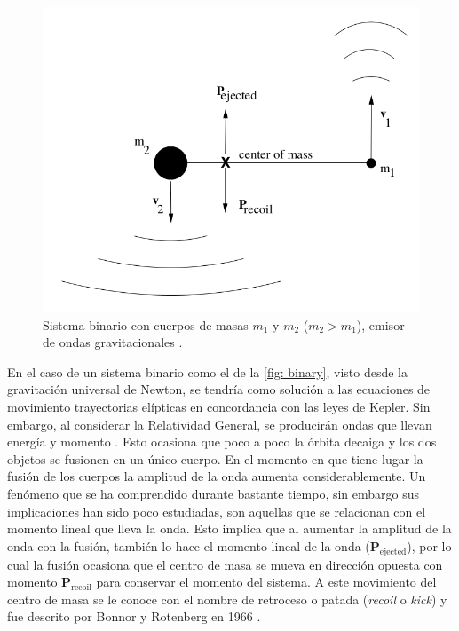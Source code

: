 	\begin{figure}[h]
		\centering
		\includegraphics[width=0.6\linewidth]{Figures/binarySystem}
		\caption{Sistema binario con cuerpos de masas $m_1$ y $m_2$ ($m_2 > m_1$), emisor de ondas gravitacionales \cite{hughes2005black}.}
		\label{fig: binary}
	\end{figure}
	
	En el caso de un sistema binario como el de la \autoref{fig: binary}, visto desde la gravitación universal de Newton, se tendría como solución a las ecuaciones de movimiento trayectorias elípticas en concordancia con las leyes de Kepler. Sin embargo, al considerar la Relatividad General, se producirán ondas que llevan energ\'ia y momento \cite{hughes2005black, hoyng2006gravitational, brugmann2018fundamentals}. Esto ocasiona que poco a poco la \'orbita decaiga y los dos objetos se fusionen en un \'unico cuerpo. En el momento en que tiene lugar la fusi\'on de los cuerpos la amplitud de la onda aumenta considerablemente. Un fen\'omeno que se ha comprendido durante bastante tiempo, sin embargo sus implicaciones han sido poco estudiadas, son aquellas que se relacionan con el momento lineal que lleva la onda. Esto implica que al aumentar la amplitud de la onda con la fusi\'on, tambi\'en lo hace el momento lineal de la onda ($\mathbf{P}_{\text{ejected}}$), por lo cual la fusi\'on ocasiona que el centro de masa se mueva en direcci\'on opuesta con momento $\mathbf{P}_{\text{recoil}}$ para conservar el momento del sistema. A este movimiento del centro de masa se le conoce con el nombre de retroceso o patada (\textit{recoil} o \textit{kick}) \cite{hughes2005black} y fue descrito por Bonnor y Rotenberg en 1966 \cite{bonnor1966gravitational}.
	
